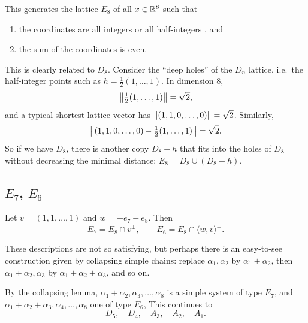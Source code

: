 This generates the lattice $E_8$ of all $x\in\mathbb{R}^8$ such that
\begin{enumerate}[label=\arabic*)]
  \item the coordinates are all integers or all half-integers , and
  \item the sum of the coordinates is even.
\end{enumerate}

This is clearly related to $D_8$. Consider the ``deep holes'' of the $D_n$ lattice, i.e.\ the
half-integer points such as $h=\frac12(1,\dots,1)$. In dimension $8$,
\[
  \left\lVert \tfrac12(1,\dots,1) \right\rVert = \sqrt2,
\]
and a typical shortest lattice vector has $\left\lVert (1,1,0,\dots,0) \right\rVert=\sqrt2$. Similarly,
\[
  \left\lVert (1,1,0,\dots,0)-\tfrac12(1,\dots,1) \right\rVert = \sqrt2 .
\]
So if we have $D_8$, there is another copy $D_8+h$ that fits into the holes of $D_8$ without
decreasing the minimal distance: $E_8 = D_8\cup(D_8+h)$.

\subsection*{\texorpdfstring{$E_7$, $E_6$}{E7, E6}}
Let $v=(1,1,\dots,1)$ and $w=-e_7-e_8$. Then
\[
  E_7 = E_8\cap v^\perp,\qquad E_6 = E_8\cap \langle w,v\rangle^\perp .
\]

These descriptions are not so satisfying, but perhaps there is an easy-to-see construction given
by collapsing simple chains: replace $\alpha_1,\alpha_2$ by $\alpha_1+\alpha_2$, then
$\alpha_1+\alpha_2,\alpha_3$ by $\alpha_1+\alpha_2+\alpha_3$, and so on.
\begin{center}
\end{center}
By the collapsing lemma, $\alpha_1+\alpha_2,\alpha_3,\dots,\alpha_8$ is a simple system of type $E_7$,
and $\alpha_1+\alpha_2+\alpha_3,\alpha_4,\dots,\alpha_8$ one of type $E_6$,  This continues
 to
\[
  D_5,\quad D_4,\quad A_3,\quad A_2,\quad A_1 .
\]

